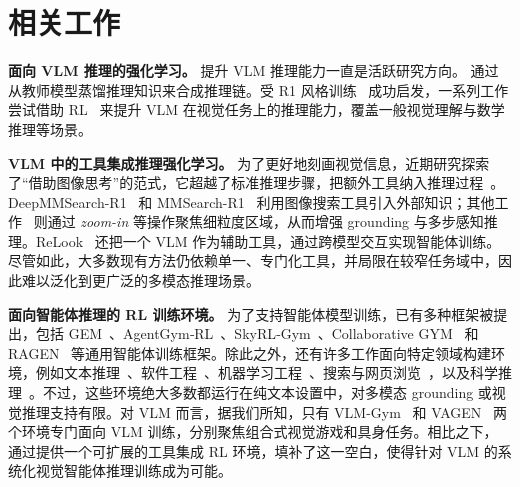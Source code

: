 \section{相关工作}
\label{sec:related}

\noindent\textbf{面向 VLM 推理的强化学习。}
提升 VLM 推理能力一直是活跃研究方向。\cite{xu2025llava} 通过从教师模型蒸馏推理知识来合成推理链。受 R1 风格训练~\citep{guo2025deepseek} 成功启发，一系列工作尝试借助 RL~\citep{huang2025vision,liu2025visualrft,shen2025vlm,liu2025visionreasoner,li2025self} 来提升 VLM 在视觉任务上的推理能力，覆盖一般视觉理解与数学推理等场景。

\noindent\textbf{VLM 中的工具集成推理强化学习。}
为了更好地刻画视觉信息，近期研究探索了“借助图像思考”的范式，它超越了标准推理步骤，把额外工具纳入推理过程~\cite{li2025tirbench,han2025tiger}。DeepMMSearch-R1~\citep{narayan2025deepmmsearchr1} 和 MMSearch-R1~\citep{wu2025mmsearchr1} 利用图像搜索工具引入外部知识；其他工作~\citep{zheng2025deepeyes,fan2025grit,su2025openthinkimg,zhang2025chain} 则通过 \emph{zoom-in} 等操作聚焦细粒度区域，从而增强 grounding 与多步感知推理。ReLook~\citep{li2025relook} 还把一个 VLM 作为辅助工具，通过跨模型交互实现智能体训练。尽管如此，大多数现有方法仍依赖单一、专门化工具，并局限在较窄任务域中，因此难以泛化到更广泛的多模态推理场景。

\noindent\textbf{面向智能体推理的 RL 训练环境。}
为了支持智能体模型训练，已有多种框架被提出，包括 GEM~\citep{liu2025gem}、AgentGym‑RL~\citep{xi2025agentgym}、SkyRL‑Gym~\citep{cao2025skyrl}、Collaborative GYM~\citep{shao2024collaborative} 和 RAGEN~\citep{wang2025ragen} 等通用智能体训练框架。除此之外，还有许多工作面向特定领域构建环境，例如文本推理~\citep{stojanovski2025reasoninggym}、软件工程~\citep{swegym,yang2025swesmith,codegym,jain2025regym}、机器学习工程~\citep{nathani2025mlgym,qiang2025mlesmith,qiang2025mledojo}、搜索与网页浏览~\citep{xiong2025rag,xu2025acesearcher,chezelles2024browsergym}，以及科学推理~\citep{xu2025medagentgym,wang2022scienceworld}。不过，这些环境绝大多数都运行在纯文本设置中，对多模态 grounding 或视觉推理支持有限。对 VLM 而言，据我们所知，只有 VLM-Gym~\citep{chen2025g1} 和 VAGEN~\citep{wang2025vagen} 两个环境专门面向 VLM 训练，分别聚焦组合式视觉游戏和具身任务。相比之下，\env{} 通过提供一个可扩展的工具集成 RL 环境，填补了这一空白，使得针对 VLM 的系统化视觉智能体推理训练成为可能。

